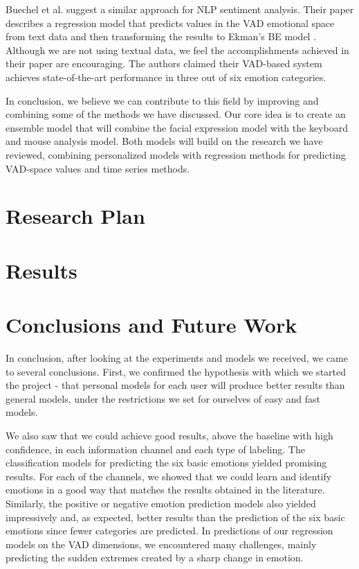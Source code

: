 \documentclass{article}
\begin{document}
Buechel et al. \cite{emotion_regression} suggest a similar approach for NLP sentiment analysis. 
Their paper describes a regression model that predicts values in the VAD emotional 
space \cite{VAD_model} from text data and then transforming the results to Ekman's BE model \cite{Ekman_Theory}. 
Although we are not using textual data, we feel the accomplishments achieved in their 
paper are encouraging. The authors claimed their VAD-based system achieves state-of-the-art 
performance in three out of six emotion categories.
\par

In conclusion, we believe we can contribute to this field by improving and combining some of the 
methods we have discussed. Our core idea is to create an ensemble model that will combine the 
facial expression model with the keyboard and mouse analysis model. 
Both models will build on the research we have reviewed, combining personalized models with 
regression methods for predicting VAD-space values and time series methods.

\newpage

\section{Research Plan}


\newpage

\section{Results}


\newpage

\section{Conclusions and Future Work}
In conclusion, after looking at the experiments and models we received, we came to several conclusions. 
First, we confirmed the hypothesis with which we started the project - that personal models for each user will produce better results than general models,
under the restrictions we set for ourselves of easy and fast models.

We also saw that we could achieve good results, above the baseline with high confidence, 
in each information channel and each type of labeling. The classification models for predicting the six basic emotions yielded promising results. 
For each of the channels, we showed that we could learn and identify emotions in a good way that matches the results obtained in the literature. 
Similarly, the positive or negative emotion prediction models also yielded impressively and, as expected, better results than the prediction of 
the six basic emotions since fewer categories are predicted. 
In predictions of our regression models on the VAD dimensions, we encountered many challenges, 
mainly predicting the sudden extremes created by a sharp change in emotion. 
\end{document}
